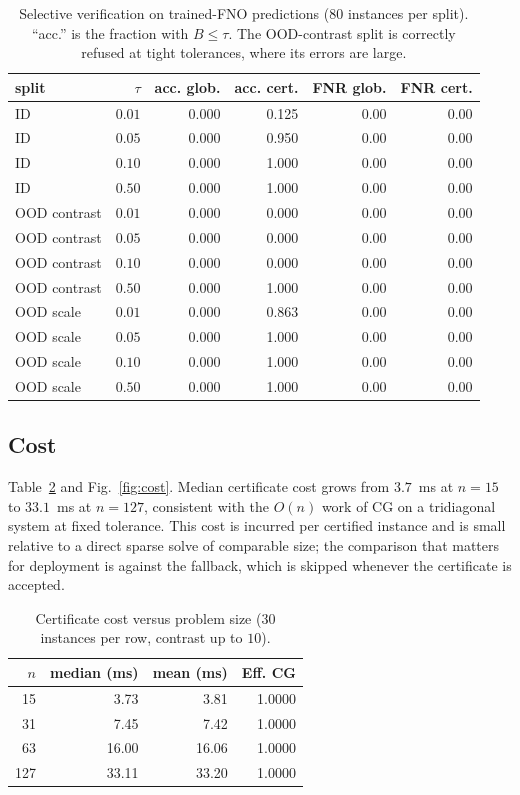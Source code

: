 \documentclass[journal]{IEEEtran}
\theoremstyle{plain}
\theoremstyle{definition}
\begin{document}
\begin{table}[t]
\centering
\caption{Selective verification on trained-FNO predictions ($80$ instances per split).
``acc.'' is the fraction with $B\le\tau$. The OOD-contrast split is correctly refused
at tight tolerances, where its errors are large.}
\label{tab:fnosel}
\begin{tabular}{lrrrrr}
\toprule
split & $\tau$ & acc. glob. & acc. cert. & FNR glob. & FNR cert.\\
\midrule
ID & $0.01$ & 0.000 & 0.125 & 0.00 & 0.00 \\
ID & $0.05$ & 0.000 & 0.950 & 0.00 & 0.00 \\
ID & $0.10$ & 0.000 & 1.000 & 0.00 & 0.00 \\
ID & $0.50$ & 0.000 & 1.000 & 0.00 & 0.00 \\
OOD contrast & $0.01$ & 0.000 & 0.000 & 0.00 & 0.00 \\
OOD contrast & $0.05$ & 0.000 & 0.000 & 0.00 & 0.00 \\
OOD contrast & $0.10$ & 0.000 & 0.000 & 0.00 & 0.00 \\
OOD contrast & $0.50$ & 0.000 & 1.000 & 0.00 & 0.00 \\
OOD scale & $0.01$ & 0.000 & 0.863 & 0.00 & 0.00 \\
OOD scale & $0.05$ & 0.000 & 1.000 & 0.00 & 0.00 \\
OOD scale & $0.10$ & 0.000 & 1.000 & 0.00 & 0.00 \\
OOD scale & $0.50$ & 0.000 & 1.000 & 0.00 & 0.00 \\
\bottomrule
\end{tabular}
\end{table}

\subsection{Cost}
Table~\ref{tab:size} and Fig.~\ref{fig:cost}. Median certificate cost grows from
$3.7$~ms at $n=15$ to $33.1$~ms at $n=127$, consistent with the $O(n)$ work of CG on a
tridiagonal system at fixed tolerance. This cost is incurred per certified instance and
is small relative to a direct sparse solve of comparable size; the comparison that
matters for deployment is against the fallback, which is skipped whenever the
certificate is accepted.

\begin{table}[t]
\centering
\caption{Certificate cost versus problem size ($30$ instances per row, contrast up to
$10$).}
\label{tab:size}
\begin{tabular}{rrrr}
\toprule
$n$ & median (ms) & mean (ms) & Eff. CG\\
\midrule
15 & 3.73 & 3.81 & 1.0000 \\
31 & 7.45 & 7.42 & 1.0000 \\
63 & 16.00 & 16.06 & 1.0000 \\
127 & 33.11 & 33.20 & 1.0000 \\
\bottomrule
\end{tabular}
\end{table}
\end{document}
